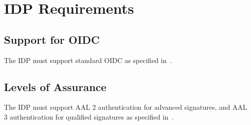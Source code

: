 \section{IDP Requirements}
\subsection{Support for OIDC}
The \gls{IDP} must support standard \gls{OIDC} as specified in~\cite{oidc}.


\subsection{Levels of Assurance}
The \gls{IDP} must support \gls{AAL} 2 authentication for advanced signatures, and \gls{AAL} 3 authentication for qualified signatures as specified in~\cite{nistdigitalidentityguidelines}.

